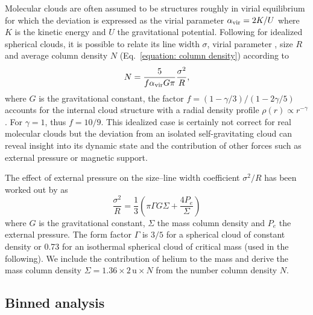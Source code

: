 Molecular clouds are often assumed to be structures roughly in virial equilibrium \citep[e.g.][]{1987ApJ...319..730S} for which the deviation is expressed as the virial parameter $\alpha_\mathrm{vir} = 2K / U$ where $K$ is the kinetic energy and $U$ the gravitational potential. Following \citet{2018ApJ...860..172S} for idealized spherical clouds, it is possible to relate its line width $\sigma$, virial parameter \avir, size $R$ and average column density $N$ (Eq.~\ref{equation: column density}) according to
\begin{equation}
    N = \frac{5}{f \alpha_\mathrm{vir} G \pi} \frac{\sigma^2}{R},
\end{equation}
where $G$ is the gravitational constant, the factor $f = (1-\gamma/3)/(1-2\gamma/5)$ accounts for the internal cloud structure with a radial density profile $\rho(r) \propto r^{-\gamma}$. For $\gamma = 1$, thus $f = 10/9$.
This idealized case is certainly not correct for real molecular clouds but the deviation from an isolated self-gravitating cloud can reveal insight into its dynamic state and the contribution of other forces such as external pressure or magnetic support.

The effect of external pressure on the size--line width coefficient $\sigma^2/R$ has been worked out by \citet{2011MNRAS.416..710F} as
\begin{equation}
    \frac{\sigma^2}{R} = \frac{1}{3} \left( \pi \Gamma G \Sigma + \frac{4P_e}{\Sigma}\right)
\end{equation}
where $G$ is the gravitational constant, $\Sigma$ the mass column density and $P_e$ the external pressure. The form factor $\Gamma$ is $3/5$ for a spherical cloud of constant density or 0.73 for an isothermal spherical cloud of critical mass (used in the following). We include the contribution of helium to the mass and derive the mass column density $\Sigma = 1.36 \times 2\,\mathrm{u} \times N$ from the number column density $N$.



\subsection{Binned analysis}
\label{dendro: section: binning}

